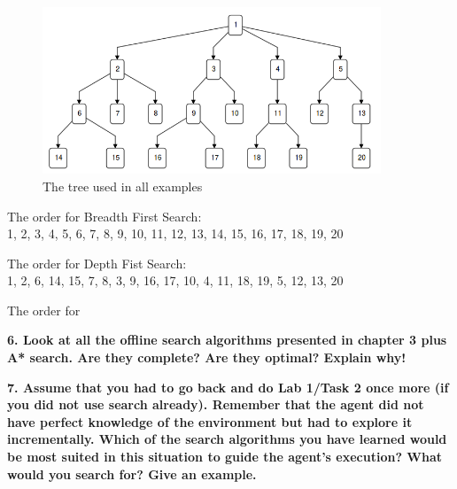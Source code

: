 \documentclass[12pt,a4paper]{article}
\begin{document}
\begin{figure}[ht]
	\centering
	\includegraphics[width=0.9\textwidth]{graph}
    \caption{The tree used in all examples}
\end{figure}


The order for Breadth First Search: \\
1, 2, 3, 4, 5, 6, 7, 8, 9, 10, 11, 12, 13, 14, 15, 16, 17, 18, 19, 20

The order for Depth Fist Search: \\
1, 2, 6, 14, 15, 7, 8, 3, 9, 16, 17, 10, 4, 11, 18, 19, 5, 12, 13, 20

The order for 



\textbf{6. Look at all the offline search algorithms presented in chapter 3 plus A* search. Are they complete? Are they optimal? Explain why!}

\textbf{7. Assume that you had to go back and do Lab 1/Task 2 once more (if you did not use search already). Remember that the agent did not have perfect knowledge of the environment but had to explore it incrementally. Which of the search algorithms you have learned would be most suited in this situation to guide the agent's execution? What would you search for? Give an example.}
\end{document}
